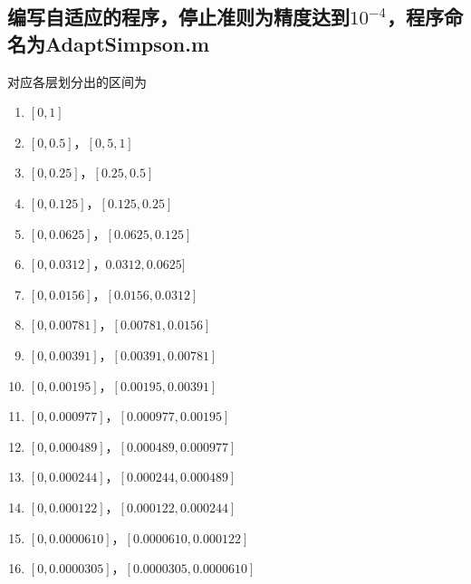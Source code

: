 \subsection{编写自适应的程序，停止准则为精度达到$10^{-4}$，程序命名为AdaptSimpson.m}
  
  对应各层划分出的区间为
  \begin{enumerate}
    \item $[0, 1]$
    \item $[0, 0.5]$，$[0,5, 1]$
    \item $[0, 0.25]$，$[0.25, 0.5]$
    \item $[0, 0.125]$，$[0.125, 0.25]$
    \item $[0, 0.0625]$，$[0.0625, 0.125]$
    \item $[0, 0.0312]$，$0.0312, 0.0625]$
    \item $[0, 0.0156]$，$[0.0156, 0.0312]$
    \item $[0, 0.00781]$，$[0.00781, 0.0156]$
    \item $[0, 0.00391]$，$[0.00391, 0.00781]$
    \item $[0, 0.00195]$，$[0.00195, 0.00391]$
    \item $[0, 0.000977]$，$[0.000977, 0.00195]$
    \item $[0, 0.000489]$，$[0.000489, 0.000977]$
    \item $[0, 0.000244]$，$[0.000244, 0.000489]$
    \item $[0, 0.000122]$，$[0.000122, 0.000244]$
    \item $[0, 0.0000610]$，$[0.0000610, 0.000122]$
    \item $[0, 0.0000305]$，$[0.0000305, 0.0000610]$
  \end{enumerate}









